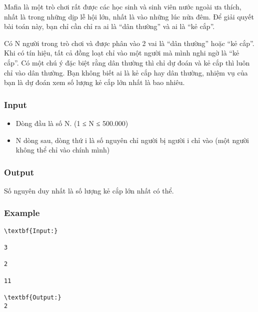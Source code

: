 



   Mafia là một trò chơi rất được các học sinh và sinh viên nước ngoài ưa thích, nhất là trong những dịp lễ hội lớn, nhất là vào những lúc nửa đêm. Để giải quyết bài toán này, bạn chỉ cần chỉ ra ai là “dân thường” và ai là “kẻ cắp”.  

   Có N người trong trò chơi và được phân vào 2 vai là “dân thường” hoặc “kẻ cắp”. Khi có tín hiệu, tất cả đồng loạt chỉ vào một người mà mình nghi ngờ là “kẻ cắp”. Có một chú ý đặc biệt rằng dân thường thì chỉ dự đoán và kẻ cắp thì luôn chỉ vào dân thường. Bạn không biết ai là kẻ cắp hay dân thường, nhiệm vụ của bạn là dự đoán xem số lượng kẻ cắp lớn nhất là bao nhiêu.  

\subsubsection{   Input  }
\begin{itemize}
	\item     Dòng đầu là số N. (1 ≤ N ≤ 500.000)   
	\item     N dòng sau, dòng thứ i là số nguyên chỉ người bị người i chỉ vào (một người không thể chỉ vào chính mình)   
\end{itemize}

\subsubsection{   Output  }

   Số nguyên duy nhất là số lượng kẻ cắp lớn nhất có thể.  

\subsubsection{   Example  }
\begin{verbatim}
\textbf{Input:}

3

2

11

\textbf{Output:}
2\end{verbatim}
